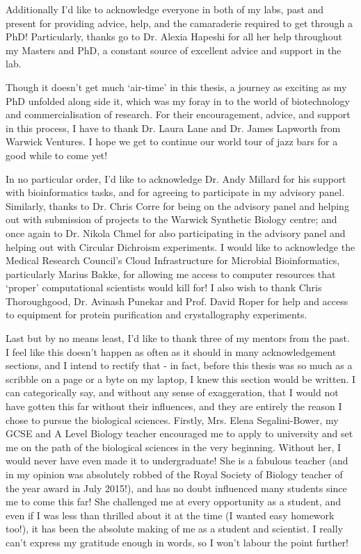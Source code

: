 Additionally I'd like to acknowledge everyone in both of my labs, past and present for providing advice, help, and the camaraderie required to get through a PhD! Particularly, thanks go to Dr. Alexia Hapeshi for all her help throughout my Masters and PhD, a constant source of excellent advice and support in the lab.

Though it doesn't get much `air-time' in this thesis, a journey as exciting as my PhD unfolded along side it, which was my foray in to the world of biotechnology and commercialisation of research. For their encouragement, advice, and support in this process, I have to thank Dr. Laura Lane and Dr. James Lapworth from Warwick Ventures. I hope we get to continue our world tour of jazz bars for a good while to come yet!

In no particular order, I'd like to acknowledge Dr. Andy Millard for his support with bioinformatics tasks, and for agreeing to participate in my advisory panel. Similarly, thanks to Dr. Chris Corre for being on the advisory panel and helping out with submission of projects to the Warwick Synthetic Biology centre; and once again to Dr. Nikola Chmel for also participating in the advisory panel and helping out with Circular Dichroism experiments. I would like to acknowledge the Medical Research Council's Cloud Infrastructure for Microbial Bioinformatics, particularly Marius Bakke, for allowing me access to computer resources that `proper' computational scientists would kill for! I also wish to thank Chris Thoroughgood, Dr. Avinash Punekar and Prof. David Roper for help and access to equipment for protein purification and crystallography experiments.

Last but by no means least, I'd like to thank three of my mentors from the past. I feel like this doesn't happen as often as it should in many acknowledgement sections, and I intend to rectify that - in fact, before this thesis was so much as a scribble on a page or a byte on my laptop, I knew this section would be written. I can categorically say, and without any sense of exaggeration, that I would not have gotten this far without their influences, and they are entirely the reason I chose to pursue the biological sciences. Firstly, Mrs. Elena Segalini-Bower, my GCSE and A Level Biology teacher encouraged me to apply to university and set me on the path of the biological sciences in the very beginning. Without her, I would never have even made it to undergraduate! She is a fabulous teacher (and in my opinion was absolutely robbed of the Royal Society of Biology teacher of the year award in July 2015!), and has no doubt influenced many students since me to come this far! She challenged me at every opportunity as a student, and even if I was less than thrilled about it at the time (I wanted easy homework too!), it has been the absolute making of me as a student and scientist. I really can't express my gratitude enough in words, so I won't labour the point further!

